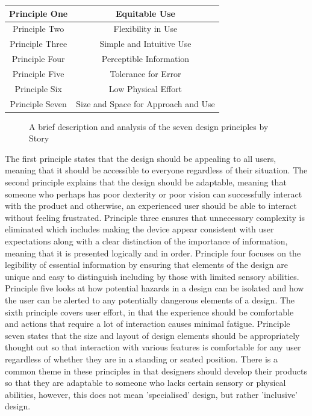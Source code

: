 \begin{center}
    \begin{tabular}{ |c|c| } %
     \hline
     Principle One & Equitable Use \cite{sevenprinciples} \\
     \hline
     Principle Two & Flexibility in Use \cite{sevenprinciples} \\ 
     \hline
     Principle Three & Simple and Intuitive Use \cite{sevenprinciples} \\ 
     \hline
     Principle Four & Perceptible Information \cite{sevenprinciples} \\
     \hline 
     Principle Five & Tolerance for Error \cite{sevenprinciples} \\ 
     \hline
     Principle Six & Low Physical Effort \cite{sevenprinciples} \\ 
     \hline
     Principle Seven & Size and Space for Approach and Use \cite{sevenprinciples} \\
     \hline
    \end{tabular}
\end{center}

\begin{figure}
    \caption{A brief description and analysis of the seven design principles by Story \cite{sevenprinciples}} %
    \label{fig:DesignPrinciples}
\end{figure}

The first principle states that the design should be appealing to all users, meaning that it should be accessible to everyone regardless of their situation.
The second principle explains that the design should be adaptable, meaning that someone who perhaps has poor dexterity or poor vision can successfully interact with the product and otherwise, an experienced user should be able to interact without feeling frustrated. %
Principle three ensures that unnecessary complexity is eliminated which includes making the device appear consistent with user expectations along with a clear distinction of the importance of information, meaning that it is presented logically and in order.
Principle four focuses on the legibility of essential information by ensuring that elements of the design are unique and easy to distinguish including by those with limited sensory abilities.
Principle five looks at how potential hazards in a design can be isolated and how the user can be alerted to any potentially dangerous elements of a design.
The sixth principle covers user effort, in that the experience should be comfortable and actions that require a lot of interaction causes minimal fatigue.
Principle seven states that the size and layout of design elements should be appropriately thought out so that interaction with various features is comfortable for any user regardless of whether they are in a standing or seated position.
There is a common theme in these principles in that designers should develop their products so that they are adaptable to someone who lacks certain sensory or physical abilities, however, this does not mean 'specialised' design, but rather 'inclusive' design.

